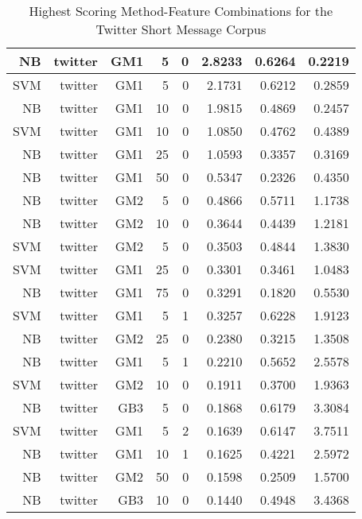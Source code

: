 \begin{table}[htbp!]
\begin{center}
\begin{tabular}{ | r | r | r | r | r | r | r | r | }
			NB	& twitter	& GM1	& 5	& 0	& 2.8233	& 0.6264	& 0.2219\\ \hline 
			SVM	& twitter	& GM1	& 5	& 0	& 2.1731	& 0.6212	& 0.2859\\ \hline 
			NB	& twitter	& GM1	& 10	& 0	& 1.9815	& 0.4869	& 0.2457\\ \hline 
			SVM	& twitter	& GM1	& 10	& 0	& 1.0850	& 0.4762	& 0.4389\\ \hline 
			NB	& twitter	& GM1	& 25	& 0	& 1.0593	& 0.3357	& 0.3169\\ \hline 
			NB	& twitter	& GM1	& 50	& 0	& 0.5347	& 0.2326	& 0.4350\\ \hline 
			NB	& twitter	& GM2	& 5	& 0	& 0.4866	& 0.5711	& 1.1738\\ \hline 
			NB	& twitter	& GM2	& 10	& 0	& 0.3644	& 0.4439	& 1.2181\\ \hline 
			SVM	& twitter	& GM2	& 5	& 0	& 0.3503	& 0.4844	& 1.3830\\ \hline 
			SVM	& twitter	& GM1	& 25	& 0	& 0.3301	& 0.3461	& 1.0483\\ \hline 
			NB	& twitter	& GM1	& 75	& 0	& 0.3291	& 0.1820	& 0.5530\\ \hline 
			SVM	& twitter	& GM1	& 5	& 1	& 0.3257	& 0.6228	& 1.9123\\ \hline 
			NB	& twitter	& GM2	& 25	& 0	& 0.2380	& 0.3215	& 1.3508\\ \hline 
			NB	& twitter	& GM1	& 5	& 1	& 0.2210	& 0.5652	& 2.5578\\ \hline 
			SVM	& twitter	& GM2	& 10	& 0	& 0.1911	& 0.3700	& 1.9363\\ \hline 
			NB	& twitter	& GB3	& 5	& 0	& 0.1868	& 0.6179	& 3.3084\\ \hline 
			SVM	& twitter	& GM1	& 5	& 2	& 0.1639	& 0.6147	& 3.7511\\ \hline 
			NB	& twitter	& GM1	& 10	& 1	& 0.1625	& 0.4221	& 2.5972\\ \hline 
			NB	& twitter	& GM2	& 50	& 0	& 0.1598	& 0.2509	& 1.5700\\ \hline 
			NB	& twitter	& GB3	& 10	& 0	& 0.1440	& 0.4948	& 3.4368\\ \hline  

		\end{tabular}
		\caption{Highest Scoring Method-Feature Combinations for the Twitter Short Message Corpus}
		\label{tab:top_twitter_by_score}
	\end{center}
\end{table}

